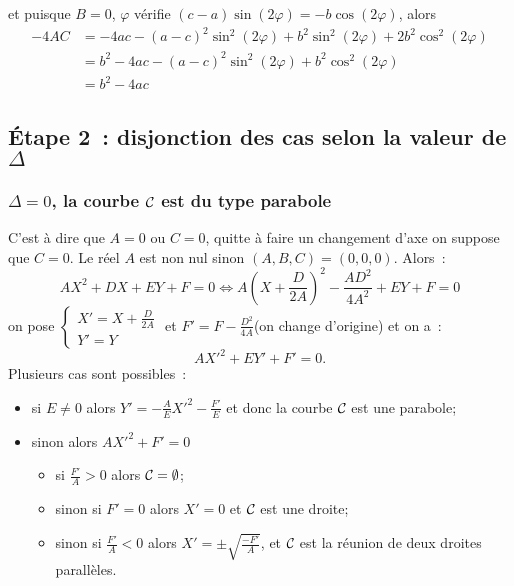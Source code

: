 et puisque $B=0$, $\varphi$ vérifie $(c-a)\sin(2\varphi)=-b\cos(2\varphi)$, alors
\begin{align}
  -4AC&=-4ac-(a-c)^2\sin^2(2\varphi)+b^2\sin^2(2\varphi)+2b^2\cos^2(2\varphi)\\
  &=b^2-4ac-(a-c)^2\sin^2(2\varphi)+b^2\cos^2(2\varphi)\\
  &=b^2-4ac
\end{align}

\subsection{Étape 2~: disjonction des cas selon la valeur de $\Delta$}
\subsubsection{$\Delta=0$, la courbe $\mathcal{C}_{{}}$ est du type parabole}
C'est à dire que $A=0$ ou $C=0$, quitte à faire un changement d'axe on suppose que $C=0$. Le réel $A$ est non nul sinon $(A,B,C)=(0,0,0)$. Alors~:
\begin{equation}
  AX^2+DX+EY+F=0 \iff A\left(X+\frac{D}{2A}\right)^2-\frac{AD^2}{4A^2}+EY+F=0
\end{equation}
on pose $\begin{cases}X'=X+\frac{D}{2A} \\ Y'=Y\end{cases}$ et $F'=F-\frac{D^2}{4A}$(on change d'origine) et on a~:
\begin{equation}
  AX'^2+EY'+F'=0.
\end{equation}
Plusieurs cas sont possibles~:
\begin{itemize}
\item si $E \neq 0$ alors $Y'=-\frac{A}{E}X'^2-\frac{F'}{E}$ et donc la courbe $\mathcal{C}_{{}}$ est une parabole;
\item sinon alors $AX'^2+F'=0$
  \begin{itemize}
  \item si $\frac{F'}{A}>0$ alors $\mathcal{C}_{{}}=\emptyset$;
  \item sinon si $F'=0$ alors $X'=0$ et $\mathcal{C}_{{}}$ est une droite;
  \item sinon si $\frac{F'}{A}<0$ alors $X'=\pm \sqrt{\frac{-F'}{A}}$, et $\mathcal{C}_{{}}$ est la réunion de deux droites parallèles.
  \end{itemize}
\end{itemize}

